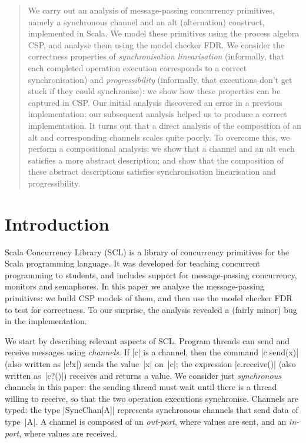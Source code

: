 \begin{abstract}
We carry out an analysis of message-passing concurrency primitives, namely a
synchronous channel and an alt (alternation) construct, implemented in Scala.
We model these primitives using the process algebra CSP, and analyse them
using the model checker FDR.  We consider the correctness properties of
\emph{synchronisation linearisation} (informally, that each completed
operation execution corresponds to a correct synchronisation) and
\emph{progressibility} (informally, that executions don't get stuck if they
could synchronise): we show how these properties can be captured in CSP\@.
Our initial analysis discovered an error in a previous implementation; our
subsequent analysis helped us to produce a correct implementation.  It turns
out that a direct analysis of the composition of an alt and corresponding
channels scales quite poorly.  To overcome this, we perform a compositional
analysis: we show that a channel and an alt each satisfies a more abstract
description; and show that the composition of these abstract descriptions
satisfies synchronisation linearisation and progressibility.
\end{abstract}


\section{Introduction}

Scala Concurrency Library (SCL) is a library of concurrency primitives for the
Scala programming language.  It was developed for teaching concurrent
programming to students, and includes support for message-passing concurrency,
monitors and semaphores.  In this paper we analyse the message-passing
primitives: we build CSP models of them, and then use the model checker FDR to
test for correctness.  To our surprise, the analysis revealed a (fairly minor)
bug in the implementation.

We start by describing relevant aspects of SCL\@.  Program threads can send
and receive messages using \emph{channels}.  If |c| is a channel, then the
command |c.send(x)| (also written as |c!x|) sends the value~|x| on~|c|; the
expression |c.receive()| (also written as~|c?()|) receives and returns a
value.  We consider just \emph{synchronous} channels in this paper: the
sending thread must wait until there is a thread willing to receive, so that
the two operation executions synchronise.  Channels are typed: the type
|SyncChan[A]| represents synchronous channels that send data of type~|A|.  A
channel is composed of an \emph{out-port}, where values are sent, and an
\emph{in-port}, where values are received.

